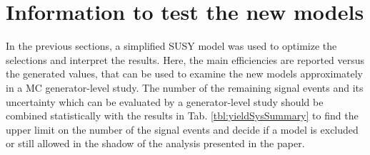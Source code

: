 \section{Information to test the new models}
\label{sect:model}
In the previous sections, a simplified SUSY model was used to optimize the selections and interpret the results. 
Here, the main efficiencies are reported versus the generated values, that can be used to examine the new models approximately in 
a MC generator-level study. The number of the remaining signal events and its uncertainty which can be evaluated by a generator-level study 
should be combined statistically with the results in Tab. \ref{tbl:yieldSysSummary} to find the upper limit on the number of the signal events
and decide if a model is excluded or still allowed in the shadow of the analysis presented in the paper.

